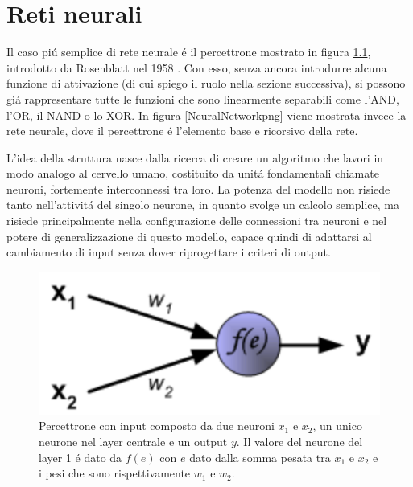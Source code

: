 \documentclass[a4paper,12pt]{report}
\begin{document}
 
 
 \chapter{Reti neurali}  
 Il caso pi\'u semplice di rete neurale \'e il percettrone mostrato in figura \ref{perceptronpng}, introdotto da Rosenblatt nel 1958 \cite{rosenblatt1958perceptron}. 
 Con esso, senza ancora introdurre alcuna funzione di attivazione (di cui spiego il ruolo nella sezione successiva), si possono gi\'a rappresentare tutte le funzioni che sono linearmente separabili come l'AND, l'OR, il NAND o lo XOR. 
 In figura \ref{NeuralNetworkpng} viene mostrata invece la rete neurale, dove il percettrone \'e l'elemento base e ricorsivo della rete. 
 
 L'idea della struttura nasce dalla ricerca di creare un algoritmo che lavori in modo analogo al cervello umano, costituito da unit\'a fondamentali chiamate neuroni, fortemente interconnessi tra loro. 
 La potenza del modello non risiede tanto nell'attivit\'a del singolo neurone, in quanto svolge un calcolo semplice, ma risiede principalmente nella configurazione delle connessioni tra neuroni e nel potere di generalizzazione di questo modello, capace quindi di adattarsi al cambiamento di input senza dover riprogettare i criteri di output.
 
 \begin{figure}[h!]
  \centering
  \includegraphics[scale=0.3]{perceptron.png}
  \caption{Percettrone con input composto da due neuroni $x_1$ e $x_2$, un unico neurone nel layer centrale e un output $y$. Il valore del neurone del layer 1 \'e dato da $f(e)$ con $e$ dato dalla somma pesata tra $x_1$ e $x_2$ e i pesi che sono rispettivamente $w_1$ e $w_2$.}
  \label{perceptronpng}
 \end{figure}
 
\end{document}
